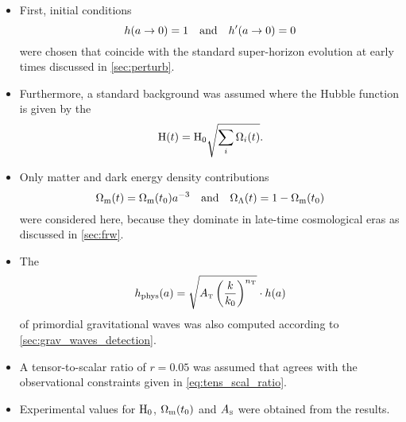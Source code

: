 \begin{itemize}

\item First, initial conditions
\begin{equation}
	h(a \to 0) = 1 \quad \text{and} \quad h^\prime(a \to 0) = 0
\end{equation}
were chosen that coincide with the standard super-horizon evolution at early times discussed in \autoref{sec:perturb}.

\item Furthermore, a standard \FLRW{} background was assumed where the Hubble function is given by the 
\begin{equation}
	\mathrm{H}(t) = \mathrm{H}_0 \sqrt{\sum_i\Omega_i(t)}
	\mathpunct{.}
\end{equation}

\item Only matter and dark energy density contributions
\begin{equation}
	\Omega_{\mathrm{m}}(t) = \Omega_{\mathrm{m}}(t_0) a^{-3} \quad \text{and} \quad \Omega_\Lambda(t) = 1 - \Omega_{\mathrm{m}}(t_0)
\end{equation}
were considered here, because they dominate in late-time cosmological eras as discussed in \autoref{sec:frw}.

\item The 
\begin{equation}
	h_\textnormal{phys}(a) = \sqrt{A_\tenspert\del{\frac{k}{k_0}}^{n_\tenspert}} \cdot h(a)
\end{equation}
of primordial gravitational waves was also computed according to \autoref{sec:grav_waves_detection}.

\item A tensor-to-scalar ratio of \(r=0.05\) was assumed that agrees with the observational constraints given in \eqref{eq:tens_scal_ratio}.

\item Experimental values for \(\mathrm{H}_0\), \(\Omega_{\mathrm{m}}(t_0)\) and \(A_{\textnormal{\tiny{S}}}\) were obtained from the \textcite{Planck2015Data} results.

\end{itemize}


